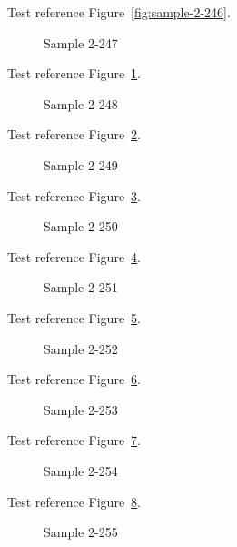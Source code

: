 Test reference Figure~\ref{fig:sample-2-246}.

\begin{figure}[tbhp]
\caption{Sample 2-247}
\label{fig:sample-2-247}
\end{figure}

Test reference Figure~\ref{fig:sample-2-247}.

\begin{figure}[tbhp]
\caption{Sample 2-248}
\label{fig:sample-2-248}
\end{figure}

Test reference Figure~\ref{fig:sample-2-248}.

\begin{figure}[tbhp]
\caption{Sample 2-249}
\label{fig:sample-2-249}
\end{figure}

Test reference Figure~\ref{fig:sample-2-249}.

\begin{figure}[tbhp]
\caption{Sample 2-250}
\label{fig:sample-2-250}
\end{figure}

Test reference Figure~\ref{fig:sample-2-250}.

\begin{figure}[tbhp]
\caption{Sample 2-251}
\label{fig:sample-2-251}
\end{figure}

Test reference Figure~\ref{fig:sample-2-251}.

\begin{figure}[tbhp]
\caption{Sample 2-252}
\label{fig:sample-2-252}
\end{figure}

Test reference Figure~\ref{fig:sample-2-252}.

\begin{figure}[tbhp]
\caption{Sample 2-253}
\label{fig:sample-2-253}
\end{figure}

Test reference Figure~\ref{fig:sample-2-253}.

\begin{figure}[tbhp]
\caption{Sample 2-254}
\label{fig:sample-2-254}
\end{figure}

Test reference Figure~\ref{fig:sample-2-254}.

\begin{figure}[tbhp]
\caption{Sample 2-255}
\label{fig:sample-2-255}
\end{figure}

